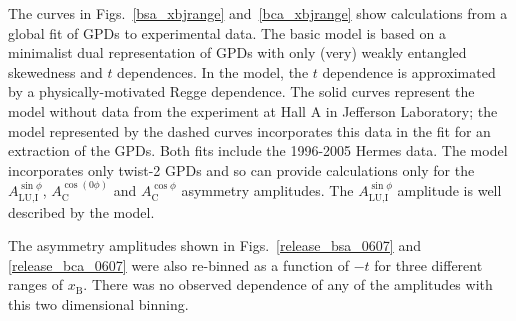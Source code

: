 The curves in Figs.~\ref{bsa_xbjrange} and~\ref{bca_xbjrange} show calculations from a global fit of GPDs to experimental data\cite{Kum09}. The basic model is based on a minimalist dual representation of GPDs with only (very) weakly entangled skewedness and $t$ dependences. In the model, the $t$ dependence is approximated by a physically-motivated Regge dependence. The solid curves represent the model  without data from the experiment \cite{Gir08,Cam06} at Hall A in Jefferson Laboratory; the model  represented by the dashed curves incorporates this data in the fit for an extraction of the GPDs. Both fits include the 1996-2005 H{\sc ermes} data. The model incorporates only twist-2 GPDs and so can provide calculations only for the $A_{\textrm{LU,I}}^{\sin\phi}$, $A_{\textrm{C}}^{\cos(0\phi)}$ and $A_{\textrm{C}}^{\cos\phi}$ asymmetry amplitudes. The $A_{\textrm{LU,I}}^{\sin\phi}$ amplitude is well described by the model. 

The asymmetry amplitudes shown in Figs.~\ref{release_bsa_0607} and \ref{release_bca_0607} were also re-binned as a function of $-t$ for three different ranges of $x_{\textrm{B}}$. There was no observed dependence of any of the amplitudes with this two dimensional binning.
